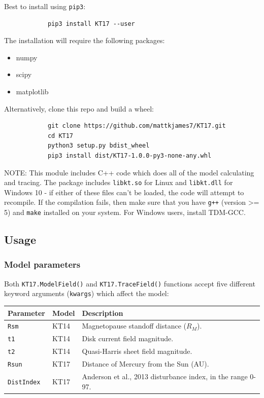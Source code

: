 			Best to install using \texttt{pip3}:
			
			\begin{verbatim}
			pip3 install KT17 --user
			\end{verbatim}
			
			The installation will require the following packages:
			
			\begin{itemize}
			\item numpy
			\item scipy
			\item matplotlib
			\end{itemize}
			
			Alternatively, clone this repo and build a wheel:
			
			\begin{verbatim}
			git clone https://github.com/mattkjames7/KT17.git
			cd KT17
			python3 setup.py bdist_wheel
			pip3 install dist/KT17-1.0.0-py3-none-any.whl
			\end{verbatim}
			
			NOTE: This module includes C++ code which does all of the model calculating and tracing. The package includes \texttt{libkt.so} for Linux and \texttt{libkt.dll} for Windows 10 - if either of these files can't be loaded, the code will attempt to recompile. If the compilation fails, then make sure that you have \texttt{g++} (version >= 5) and \texttt{make} installed on your system. For Windows users, install TDM-GCC.
			
			\subsection{Usage}
			
			\subsubsection{Model parameters}
			
			Both \texttt{KT17.ModelField()} and \texttt{KT17.TraceField()} functions accept five different keyword arguments (\texttt{\*\*kwargs}) which affect the model:
			
			\begin{table}[H]
			\centering
			\begin{tabular}{|l|l|l|}
			\hline
			Parameter & Model & Description \\
			\hline
			\texttt{Rsm} & KT14 & Magnetopause standoff distance (\texttt{$R_M$}). \\
			\texttt{t1} & KT14 & Disk current field magnitude. \\
			\texttt{t2} & KT14 & Quasi-Harris sheet field magnitude. \\
			\texttt{Rsun} & KT17 & Distance of Mercury from the Sun (AU). \\
			\texttt{DistIndex} & KT17 & Anderson et al., 2013 disturbance index, in the range 0-97. 
			\hline
			\end{tabular}
			\end{table}
			
